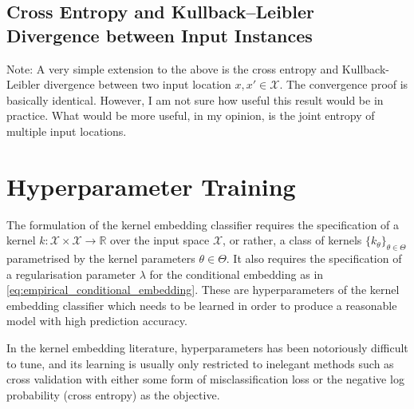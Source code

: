 \documentclass{article}
\newcommand{\note}[1]{{\color{orange} #1}}
\begin{document}
	\subsection{Cross Entropy and Kullback–Leibler Divergence between Input Instances}

		\note{Note: A very simple extension to the above is the cross entropy and Kullback-Leibler divergence between two input location $x, x' \in \mathcal{X}$. The convergence proof is basically identical. However, I am not sure how useful this result would be in practice. What would be more useful, in my opinion, is the joint entropy of multiple input locations.}
\section{Hyperparameter Training}
\label{sec:hyperparameter_learning}

	The formulation of the kernel embedding classifier requires the specification of a kernel $k : \mathcal{X} \times \mathcal{X} \to \mathbb{R}$ over the input space $\mathcal{X}$, or rather, a class of kernels $\{k_{\theta}\}_{\theta \in \Theta}$ parametrised by the kernel parameters $\theta \in \Theta$. It also requires the specification of a regularisation parameter $\lambda$ for the conditional embedding as in \eqref{eq:empirical_conditional_embedding}. These are hyperparameters of the kernel embedding classifier which needs to be learned in order to produce a reasonable model with high prediction accuracy. 

	In the kernel embedding literature, hyperparameters has been notoriously difficult to tune, and its learning is usually only restricted to inelegant methods such as cross validation with either some form of misclassification loss or the negative log probability (cross entropy) as the objective.

\end{document}
